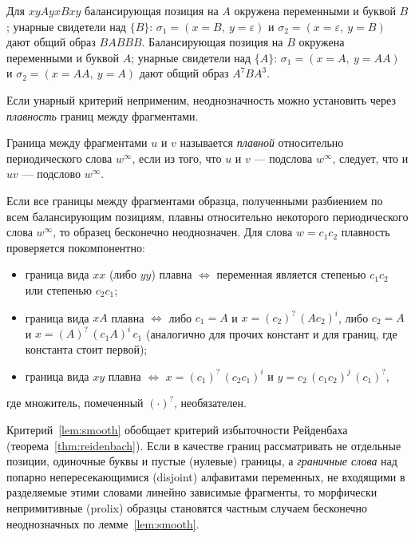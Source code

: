 \documentclass[14pt, russian]{scrartcl}
\begin{document}
\begin{Example}
Для $x y A y x B x y$ балансирующая позиция на $A$ окружена переменными и буквой $B$;
унарные свидетели над $\{B\}$: $\sigma_1 = (x{=}B,\ y{=}\varepsilon)$ и
$\sigma_2 = (x{=}\varepsilon,\ y{=}B)$ дают общий образ $BABBB$. Балансирующая позиция
на $B$ окружена переменными и буквой $A$; унарные свидетели над $\{A\}$:
$\sigma_1 = (x{=}A,\ y{=}AA)$ и $\sigma_2 = (x{=}AA,\ y{=}A)$ дают общий образ
$A^7 B A^3$.
\end{Example}

Если унарный критерий неприменим, неоднозначность можно установить через
\textit{плавность} границ между фрагментами.

\begin{Definition}
Граница между фрагментами $u$ и $v$ называется \textit{плавной} относительно
периодического слова $w^\infty$, если из того, что $u$ и $v$ --- подслова $w^\infty$,
следует, что и $uv$ --- подслово $w^\infty$.
\end{Definition}

\begin{Lemma}
\label{lem:smooth}
Если все границы между фрагментами образца, полученными разбиением по всем
балансирующим позициям, плавны относительно некоторого периодического слова
$w^\infty$, то образец бесконечно неоднозначен. Для слова $w = c_1 c_2$ плавность
проверяется покомпонентно:
\begin{itemize}
\item граница вида $x x$ (либо $y y$) плавна $\iff$ переменная является степенью
  $c_1 c_2$ или степенью $c_2 c_1$;
\item граница вида $x A$ плавна $\iff$ либо $c_1 = A$ и $x = (c_2)^{?}\,(A c_2)^{i}$,
  либо $c_2 = A$ и $x = (A)^{?}\,(c_1 A)^{i}\, c_1$ (аналогично для прочих констант и
  для границ, где константа стоит первой);
\item граница вида $x y$ плавна $\iff$ $x = (c_1)^{?}\,(c_2 c_1)^{i}$ и
  $y = c_2\,(c_1 c_2)^{j}\,(c_1)^{?}$,
\end{itemize}
где множитель, помеченный $(\cdot)^{?}$, необязателен.
\end{Lemma}

\begin{Consequent}
\label{cor:generalizes}
Критерий~\ref{lem:smooth} обобщает критерий избыточности Рейденбаха
(теорема~\ref{thm:reidenbach}). Если в качестве границ рассматривать не отдельные
позиции, одиночные буквы и пустые (нулевые) границы, а \textit{граничные слова} над
попарно непересекающимися (disjoint) алфавитами переменных, не входящими в
разделяемые этими словами линейно зависимые фрагменты, то морфически непримитивные
(prolix) образцы становятся частным случаем бесконечно неоднозначных по
лемме~\ref{lem:smooth}.
\end{Consequent}
\end{document}
